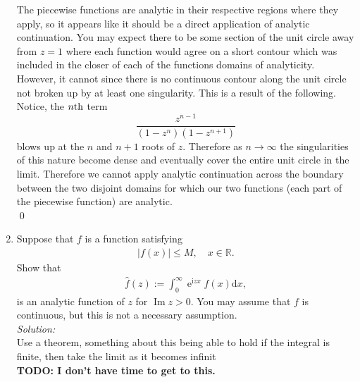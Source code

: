 \documentclass[10pt]{amsart}
\newcommand{\D}{\mathrm{d}}
\newcommand{\I}{\mathrm{i}}
\DeclareMathOperator{\E}{e}
\DeclareMathOperator{\imag}{Im}
\theoremstyle{nonumberplain}
\begin{document}
\begin{enumerate}[label={\bf {\arabic*}:}]
\noindent
The piecewise functions are analytic in their respective regions where they apply, so it appears like it should be a direct application of analytic continuation.
You may expect there to be some section of the unit circle away from $z = 1$ where each function would agree on a short contour which was included in the closer of each of the functions domains of analyticity.
However, it cannot since there is no continuous contour along the unit circle not broken up by at least one singularity.
This is a result of the following.
Notice, the $n{\rm th}$ term 
$$
\frac{z^{n-1}}{\left(1-z^n\right)\left(1-z^{n+1}\right)}
$$
blows up at the $n$ and $n + 1$ roots of $z$.
Therefore as $n \rightarrow \infty$ the singularities of this nature become dense and eventually cover the entire unit circle in the limit.
Therefore we cannot apply analytic continuation across the boundary between the two disjoint domains for which our two functions (each part of the piecewise function) are analytic. \\
\qed

\newpage

\item Suppose that $f$ is a function satisfying
  \begin{align*}
    |f(x)| \leq M, \quad x \in \mathbb R.
  \end{align*}
  Show that
  \begin{align*}
    \hat f(z) := \int_0^\infty \E^{\I z x} f(x) \D x,
  \end{align*}
  is an analytic function of $z$ for $\imag z > 0$.  You may assume
  that $f$ is continuous, but this is not a necessary assumption.\\
  
\noindent
\textit{Solution:} \\
Use a theorem, something about this being able to hold if the integral is finite, then take the limit as it becomes infinit \\
\textbf{TODO: I don't have time to get to this.}
\newpage


\end{enumerate}
\end{document}
